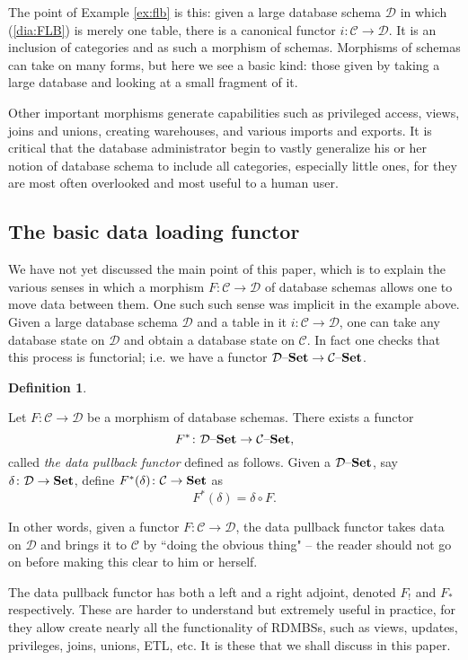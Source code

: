 \documentclass{amsart}
\def\mc{\mathcal}
\def\to{\rightarrow}
\def\taking{\colon}
\def\Set{{\bf Set}}
\def\set{{\text \textendash}{\bf Set}}
\def\mcC{\mc{C}}
\def\mcD{\mc{D}}
\theoremstyle{remark}
\theoremstyle{definition}
\newtheorem{definition}[theorem]{Definition}
\begin{document}
The point of Example \ref{ex:flb} is this: given a large database schema $\mcD$ in which (\ref{dia:FLB}) is merely one table, there is a canonical functor $i\taking\mcC\to\mcD$.  It is an inclusion of categories and as such a morphism of schemas.  Morphisms of schemas can take on many forms, but here we see a basic kind: those given by taking a large database and looking at a small fragment of it.  

Other important morphisms generate capabilities such as privileged access, views, joins and unions, creating warehouses, and various imports and exports.  It is critical that the database administrator begin to vastly generalize his or her notion of database schema to include all categories, especially little ones, for they are most often overlooked and most useful to a human user.

\subsection{The basic data loading functor}

We have not yet discussed the main point of this paper, which is to explain the various senses in which a morphism $F\taking\mcC\to\mcD$ of database schemas allows one to move data between them.  One such such sense was implicit in the example above.  Given a large database schema $\mcD$ and a table in it $i\taking\mcC\to\mcD$, one can take any database state on $\mcD$ and obtain a database state on $\mcC$.  In fact one checks that this process is functorial; i.e. we have a functor $\mcD\set\to\mcC\set$.  

\begin{definition}\label{def:data pullback}

Let $F\taking\mcC\to\mcD$ be a morphism of database schemas.  There exists a functor $$F^*\taking\mcD\set\to\mcC\set,$$ called {\em the data pullback functor} defined as follows.  Given a $\mcD\set$, say $\delta\taking\mcD\to\Set$, define $F^*(\delta)\taking\mcC\to\Set$ as $$F^*(\delta)=\delta\circ F.$$  

\end{definition}

In other words, given a functor $F\taking\mcC\to\mcD$, the data pullback functor takes data on $\mcD$ and brings it to $\mcC$ by ``doing the obvious thing" -- the reader should not go on before making this clear to him or herself.

The data pullback functor has both a left and a right adjoint, denoted $F_!$ and $F_*$ respectively.  These are harder to understand but extremely useful in practice, for they allow create nearly all the functionality of RDMBSs, such as views, updates, privileges, joins, unions, ETL, etc.  It is these that we shall discuss in this paper.
\end{document}
